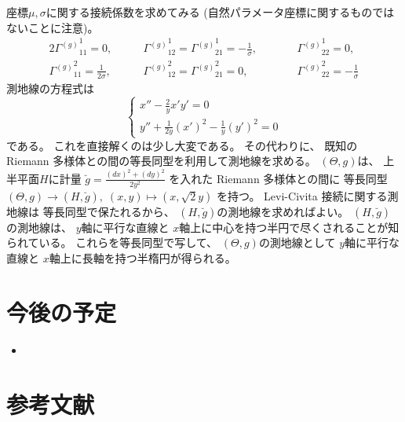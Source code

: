 \documentclass[report]{jlreq}
\begin{document}
\begin{example}[正規分布族]
    座標$\mu, \sigma$に関する接続係数を求めてみる
    (自然パラメータ座標に関するものではないことに注意)。
    \begin{alignat}{2}
        {\Gamma^{(g)}}_{11}^1
            = 0,
            &\qquad
                {\Gamma^{(g)}}_{12}^1
                    = {\Gamma^{(g)}}_{21}^1
                    = -\frac{1}{\sigma},
            &&\qquad
                {\Gamma^{(g)}}_{22}^1
                    = 0,
            \\
        {\Gamma^{(g)}}_{11}^2
            = \frac{1}{2\sigma},
            &\qquad
                {\Gamma^{(g)}}_{12}^2
                    = {\Gamma^{(g)}}_{21}^2
                    = 0,
            &&\qquad
                {\Gamma^{(g)}}_{22}^2
                    = -\frac{1}{\sigma}
    \end{alignat}
    測地線の方程式は
    \begin{equation}
        \begin{cases}
            x'' - \frac{2}{y} x' y' = 0 \\
            y'' + \frac{1}{2y} (x')^2 - \frac{1}{y} (y')^2 = 0
        \end{cases}
    \end{equation}
    である。
    これを直接解くのは少し大変である。
    その代わりに、
    既知の Riemann 多様体との間の等長同型を利用して測地線を求める。
    $(\Theta, g)$は、
    上半平面$H$に計量
    $\breve{g} = \frac{(dx)^2 + (dy)^2}{2y^2}$
    を入れた Riemann 多様体との間に
    等長同型$(\Theta, g) \to (H, \breve{g}), \;
        (x, y) \mapsto (x, \sqrt{2}y)$
    を持つ。
    Levi-Civita 接続に関する測地線は
    等長同型で保たれるから、
    $(H, \breve{g})$の測地線を求めればよい。
    $(H, \breve{g})$の測地線は、
    $y$軸に平行な直線と
    $x$軸上に中心を持つ半円で尽くされることが知られている。
    これらを等長同型で写して、
    $(\Theta, g)$の測地線として
    $y$軸に平行な直線と
    $x$軸上に長軸を持つ半楕円が得られる。
\end{example}


%
\section*{今後の予定}

\begin{itemize}
    \item \TODO{}
\end{itemize}

%
\section*{参考文献}

\nocite{amari_information_2016}

{
    \renewcommand{\bibsection}{}
    
    
}
\end{document}
